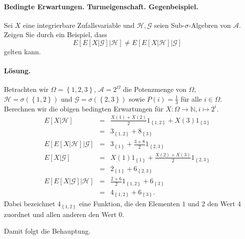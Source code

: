 \paragraph{Bedingte Erwartungen. Turmeigenschaft. Gegenbeispiel. } Sei $X$ eine integrierbare Zufallsvariable
und $\mathcal H, \mathcal G$ seien Sub-$\sigma$-Algebren von $\mathcal A$. 
Zeigen Sie durch ein Beispiel, dass 
\begin{equation}
	E\left[ E\left[ X | \mathcal G \right] | \mathcal H \right] \neq
	E\left[ E\left[ X | \mathcal H \right] | \mathcal G \right]
\end{equation}
gelten kann. 

\paragraph*{Lösung. } 
Betrachten wir $\Omega=\left\{ 1,2,3 \right\}$, $\mathcal A=2^\Omega$ die Potenzmenge von $\Omega$,
$\mathcal H=\sigma\left( \left\{ 1,2 \right\} \right)$ und 
$\mathcal G=\sigma\left( \left\{ 2,3 \right\} \right)$ sowie 
$P\left( i \right)=\frac{1}{3}$ für alle $i\in\Omega$. Berechnen wir die obigen bedingten
Erwartungen für $X:\Omega\to\mathbb N, i\mapsto 2^i$.
\begin{eqnarray}
	E\left[ X|\mathcal H \right] &=&
	\frac{X\left( 1 \right)+X\left( 2 \right)}{2}1_{\left\{ 1,2 \right\}} + X\left( 3 \right) 1_{ \left\{ 3 \right\} } \\
	&=& 3_{  \left\{ 1,2 \right\} } + 8_{ \left\{ 3 \right\}  } \\ 
	E\left[ E\left[ X|\mathcal H \right]|\mathcal G \right] 
	&=& 3_{ \left\{ 1 \right\} } + \frac{3+8}{2} 1_{ \left\{ 2,3 \right\} } \\
	E\left[ X|\mathcal G \right] &=& 
	X\left( 1 \right) 1_{ \left\{ 1 \right\} } + \frac{X\left( 2 \right)+X\left( 3 \right)}{2}1_{ \left\{ 2,3 \right\} } \\
	&=& 2_{ \left\{ 1 \right\} } + 6_{ \left\{ 2,3 \right\} } \\
	E\left[ E\left[ X|\mathcal G \right]| \mathcal H \right] 
	&=& \frac{2+6}{2}1_{ \left\{ 1,2 \right\} } + 6_{ \left\{ 3 \right\} } \\
	&=& 4_{ \left\{ 1,2 \right\} } + 6_{ \left\{ 3 \right\} }.
\end{eqnarray}
Dabei bezeichnet $4_{ \left\{ 1,2 \right\} }$ eine Funktion, die den Elementen $1$ und $2$
den Wert $4$ zuordnet und allen anderen den Wert $0$.

Damit folgt die Behauptung. 






